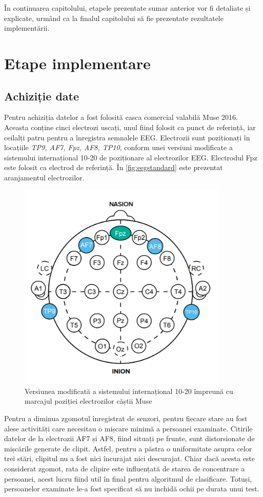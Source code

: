 În continuarea capitolului, etapele prezentate sumar anterior vor fi detaliate și explicate, urmând ca la finalul capitolului să fie prezentate rezultatele implementării.

\section{Etape implementare}

\subsection{Achiziție date}\label{ss:achizitie-date}
Pentru achiziția datelor a fost folosită casca comercial valabilă Muse 2016. Aceasta conține cinci electrozi uscați, unul fiind folosit ca punct de referință, iar ceilalți patru pentru a înregistra semnalele EEG. Electrozii sunt poziționați în locațiile \textit{TP9, AF7, Fpz, AF8, TP10}, conform unei versiuni modificate a sistemului internațional 10-20 de poziționare al electrozilor EEG. Electrodul Fpz este folosit ca electrod de referință. În \autoref{fig:eegstandard} este prezentat aranjamentul electrozilor.

\begin{figure}[ht]
\centering
\includegraphics[width=10cm, keepaspectratio]{fig/cap3/EEGstandard.png}
\caption{Versiunea modificată a sistemului internațional 10-20 împreună cu marcajul poziției electrozilor căștii Muse \cite{online:muse-eeg}}
\label{fig:eegstandard}
\end{figure}

Pentru a diminua zgomotul înregistrat de senzori, pentru fiecare stare au fost alese activități care necesitau o mișcare minimă a persoanei examinate. Citirile datelor de la electrozii AF7 și AF8, fiind situați pe frunte, sunt distorsionate de mișcările generate de clipit. Astfel, pentru a păstra o uniformitate asupra celor trei stări, clipitul nu a fost nici încurajat nici descurajat. Chiar dacă acesta este considerat zgomot, rata de clipire este influențată de starea de concentrare a persoanei, acest lucru fiind util în final pentru algoritmul de clasificare. Totuși, persoanelor examinate le-a fost specificat să nu inchidă ochii pe durata unui test.

